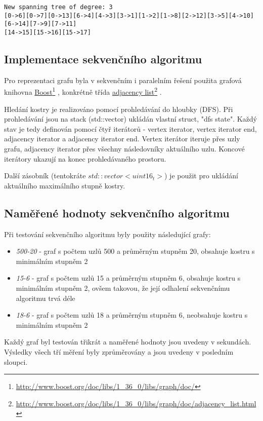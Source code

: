 \documentclass[]{article}
\newcommand\fnurl[2]{%
  \href{#2}{#1}\footnote{\url{#2}}%
}
\begin{document}
\begin{verbatim}
New spanning tree of degree: 3
[0->6][0->7][0->13][6->4][4->3][3->1][1->2][1->8][2->12][3->5][4->10][6->14][7->9][7->11]
[14->15][15->16][15->17]
\end{verbatim}

\subsection{Implementace sekvenčního algoritmu}
Pro reprezentaci grafu byla v sekvenčním i paralelním řešení použita grafová knihovna \fnurl{Boost}{http://www.boost.org/doc/libs/1_36_0/libs/graph/doc/}, konkrétně třída \fnurl{adjacency list}{http://www.boost.org/doc/libs/1_36_0/libs/graph/doc/adjacency_list.html}.

Hledání kostry je realizováno pomocí prohledávání do hloubky (DFS). Při prohledávání jsou na stack (std::vector) ukládán vlastní struct, "dfs state". Každý stav je tedy definován pomocí čtyř iterátorů - vertex iterator, vertex iterator end, adjacency iterator a adjacency iterator end. Vertex iterátor iteruje přes uzly grafu, adjacency iterator přes všechny následovníky aktuálního uzlu. Koncové iterátory ukazují na konec prohledávaného prostoru.

Další zásobník (tentokráte $std::vector<uint16_t>$) je použit pro ukládání aktuálního maximálního stupně kostry. 

\subsection{Naměřené hodnoty sekvenčního algoritmu}
Při testování sekvenčního algoritmu byly použity následující grafy:

\begin{itemize}
  \item \textit{500-20} - graf s počtem uzlů 500 a průměrným stupněm 20, obsahuje kostru s minimálním stupněm 2
  \item \textit{15-6} - graf s počtem uzlů 15 a průměrným stupněm 6, obsahuje kostru s minimálním stupněm 2, ovšem takovou, že její odhalení sekvenčnímu algoritmu trvá déle
  \item \textit{18-6} - graf s počtem uzlů 18 a průměrným stupněm 6, neobsahuje kostru s minimálním stupněm 2
\end{itemize}

Každý graf byl testován třikrát a naměřené hodnoty jsou uvedeny v sekundách. Výsledky všech tří měření byly zprůměrovány a jsou uvedeny v posledním sloupci.
\end{document}
